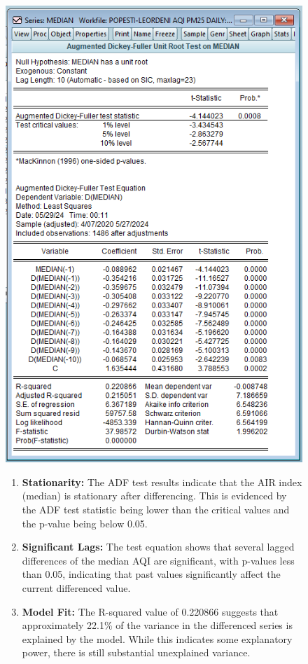 \documentclass{article} %
\begin{document}
\begin{figure}[H]
    \centering
    \begin{minipage}{0.5\linewidth}
        \includegraphics[width=\linewidth]{images/image12.png}
    \end{minipage}%
    \begin{minipage}{0.5\linewidth}
        \begin{enumerate}
            \item \textbf{Stationarity:} The ADF test results indicate that the AIR index (median) is stationary after differencing. This is evidenced by the ADF test statistic being lower than the critical values and the p-value being below 0.05.
            \item \textbf{Significant Lags:} The test equation shows that several lagged differences of the median AQI are significant, with p-values less than 0.05, indicating that past values significantly affect the current differenced value.
            \item \textbf{Model Fit:} The R-squared value of 0.220866 suggests that approximately 22.1\% of the variance in the differenced series is explained by the model. While this indicates some explanatory power, there is still substantial unexplained variance.
        \end{enumerate}
    \end{minipage}
\end{figure}
\end{document}
